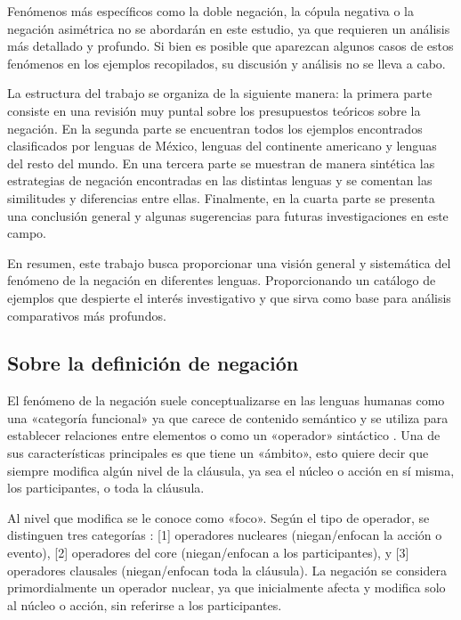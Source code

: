Fenómenos más específicos como la doble negación, la cópula negativa o la negación asimétrica no se abordarán en este estudio, ya que requieren un análisis más detallado y profundo. Si bien es posible que aparezcan algunos casos de estos fenómenos en los ejemplos recopilados, su discusión y análisis no se lleva a cabo.

La estructura del trabajo se organiza de la siguiente manera: la primera parte consiste en una revisión muy puntal sobre los presupuestos teóricos sobre la negación. En la segunda parte se encuentran todos los ejemplos encontrados clasificados por lenguas de México, lenguas del continente americano y lenguas del resto del mundo. En una tercera parte se muestran de manera sintética las estrategias de negación encontradas en las distintas lenguas y se comentan las similitudes y diferencias entre ellas. Finalmente, en la cuarta parte se presenta una conclusión general y algunas sugerencias para futuras investigaciones en este campo.

En resumen, este trabajo busca proporcionar una visión general y sistemática del fenómeno de la negación en diferentes lenguas. Proporcionando un catálogo de ejemplos que despierte el interés investigativo y que sirva como base para análisis comparativos más profundos.

\subsection*{Sobre la definición de negación}

\noindent El fenómeno de la negación suele conceptualizarse en las lenguas humanas como una «categoría funcional» ya que carece de contenido semántico y se utiliza para establecer relaciones entre elementos o como un «operador» sintáctico \textcolor{MidnightBlue}{\citep{lawler,CasasNavarro2005}}. Una de sus características principales es que tiene un «ámbito», esto quiere decir que siempre modifica algún nivel de la cláusula, ya sea el núcleo o acción en sí misma, los participantes, o toda la cláusula.

Al nivel que modifica se le conoce como «foco». Según el tipo de operador, se distinguen tres categorías \textcolor{MidnightBlue}{\citep{Valin}}: [1] operadores nucleares (niegan/enfocan la acción o evento), [2] operadores del core (niegan/enfocan a los participantes), y [3] operadores clausales (niegan/enfocan toda la cláusula). La negación se considera primordialmente un operador nuclear, ya que inicialmente afecta y modifica solo al núcleo o acción, sin referirse a los participantes.

